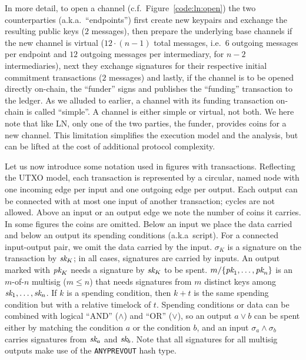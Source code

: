  In more detail, to open a channel (c.f.\ Figure~\ref{code:ln:open}) the two
  counterparties (a.k.a.\ ``endpoints'') first create new keypairs and exchange
  the resulting public keys ($2$ messages), then prepare the underlying base
  channels if the new channel is virtual ($12 \cdot (n-1)$ total messages, i.e.\
  $6$ outgoing messages per endpoint and $12$ outgoing messages per
  intermediary, for $n-2$ intermediaries), next they exchange signatures for
  their respective initial commitment transactions ($2$ messages) and lastly, if
  the channel is to be opened directly on-chain, the ``funder'' signs and publishes
  the ``funding'' transaction to the ledger. As we alluded to earlier, a channel
  with its funding transaction on-chain is called ``simple''. A channel is
  either simple or virtual, not both. We here note that like LN, only one of the
  two parties, the funder, provides coins for a new channel. This limitation
  simplifies the execution model and the analysis, but can be lifted at the cost
  of additional protocol complexity.

  Let us now introduce some notation used in figures with transactions.
  Reflecting the UTXO model, each transaction is represented by a circular,
  named node with one incoming edge per input and one outgoing edge per output.
  Each output can be connected with at most one input of another transaction;
  cycles are not allowed. Above an input or an output edge we note the number of
  coins it carries. In some figures the coins are omitted. Below an input we
  place the data carried and below an output its spending conditions (a.k.a\
  script). For
  a connected input-output pair, we omit the data carried by the input.
  $\sigma_K$ is a signature on the transaction by $\textit{sk}_{K}$; in all cases, signatures
  are carried by inputs. An output marked
  with $\textit{pk}_{K}$ needs a signature by $\textit{sk}_{K}$ to be spent. $m/\{\textit{pk}_{1}, \dots,
  \textit{pk}_{n}\}$ is an $m$-of-$n$ multisig ($m \leq n$) that needs signatures from
  $m$ distinct keys among $\textit{sk}_{1}, \dots, \textit{sk}_{n}$. If $k$ is a spending
  condition, then $k + t$ is the same spending condition but with a relative timelock
  of $t$. Spending conditions or data can be combined with logical ``AND''
  ($\wedge$) and ``OR'' ($\vee$), so an output $a \vee b$ can be spent either by
  matching the condition $a$ or the condition $b$, and an input $\sigma_a \wedge
  \sigma_b$ carries signatures from $\textit{sk}_{a}$ and $\textit{sk}_{b}$.
  Note that all signatures for all multisig outputs make use of the
  \texttt{ANYPREVOUT} hash type.

